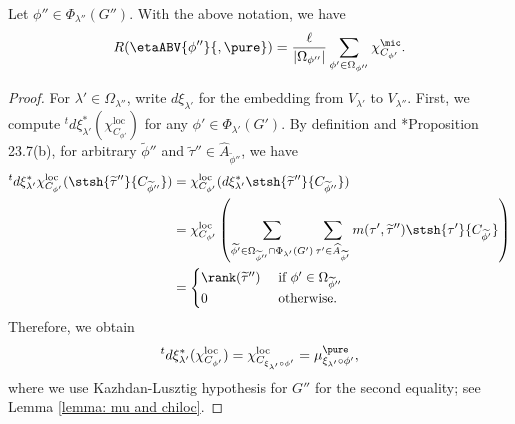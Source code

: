 \documentclass[11pt,letterpaper]{amsart}
\numberwithin{equation}{section}
\begin{document}
\begin{lemma}\label{lem disconnected R ABV}
Let $\phi'' \in \Phi_{\lambda''}(G'')$.    With the above notation, we have 
    \[ R(\etaABV{\phi''}{, \pure})= \frac{\ell}{|\Omega_{\phi''}|} \sum_{\phi' \in \Omega_{\phi''}} \chi_{C_{\phi'}}^{\mic}.\]
\end{lemma}
\begin{proof}
For $\lambda' \in \Omega_{\lambda''}$, write $d\xi_{\lambda'}$ for the embedding from $V_{\lambda'}$ to $V_{\lambda''}$.    First, we compute ${}^td\xi_{\lambda'}^{\ast}(\chi_{C_{\phi'}}^{\textrm{loc}}) $ for any $\phi' \in \Phi_{\lambda'}(G')$. By definition and \cite{ABV92}*{Proposition 23.7(b)}, for arbitrary $\widetilde{\phi}''$ and $\widetilde{\tau}'' \in \widehat{A}_{\widetilde{\phi}''}$,
we have
\begin{align*}
{}^td\xi_{\lambda'}^{\ast}\chi_{C_{\phi'}}^{\textrm{loc}}(
  \stsh{\widetilde{\tau}''}{C_{\widetilde{\phi}''}})&= \chi_{C_{\phi'}}^{\textrm{loc}}(d\xi_{\lambda'}^{\ast}\stsh{\widetilde{\tau}''}{C_{\widetilde{\phi}''}})\\
    &= \chi_{C_{\phi'}}^{\textrm{loc}}\left( \sum_{\widetilde{\phi'}\in \Omega_{\widetilde{\phi}''} \cap \Phi_{\lambda'}(G')} \sum_{\tau' \in \widehat{A}_{\widetilde{\phi'}}}m(\tau', \widetilde{\tau}'')\stsh{\tau'}{C_{\widetilde{\phi'}}} \right)\\
    &= \begin{cases}
          \rank(\widetilde{\tau}'') & \text{ if }\phi' \in \Omega_{\widetilde{\phi}''}\\
        0& \text{ otherwise.}
    \end{cases}
\end{align*}
Therefore, we obtain
\[{}^td\xi_{\lambda'}^{\ast}( \chi_{C_{\phi'}}^{\textrm{loc}}) = \chi_{C_{\xi_{\lambda'} \circ \phi'}}^{\textrm{loc}}= \mu_{\xi_{\lambda'} \circ \phi'}^{\pure},\]
where we use Kazhdan-Lusztig hypothesis for $G''$ for the second equality; see Lemma \ref{lemma: mu and chiloc}. 



\end{proof}
\end{document}
